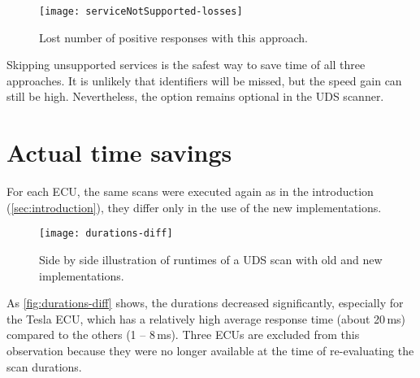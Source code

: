 \begin{figure}[htb]
    \centering
    \texttt{[image: serviceNotSupported-losses]}
    \caption{Lost number of positive responses with this approach.}
    \label{fig:serviceNotSupported-losses}
\end{figure}

Skipping unsupported services is the safest way to save time of all three approaches. It is unlikely that identifiers will be missed, but the speed gain can still be high. Nevertheless, the option remains optional in the UDS scanner.

\section{Actual time savings}

For each ECU, the same scans were executed again as in the introduction (\autoref{sec:introduction}), they differ only in the use of the new implementations.

\begin{figure}[htb]
    \centering
    \texttt{[image: durations-diff]}
    \caption{Side by side illustration of runtimes of a UDS scan with old and new implementations.}
    \label{fig:durations-diff}
\end{figure}

As \autoref{fig:durations-diff} shows, the durations decreased significantly, especially for the Tesla ECU, which has a relatively high average response time (about 20\,ms) compared to the others (1 – 8\,ms).
Three ECUs are excluded from this observation because they were no longer available at the time of re-evaluating the scan durations.
